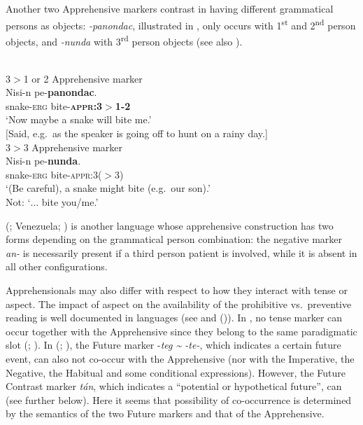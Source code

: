 \documentclass[output=paper,colorlinks,citecolor=brown]{langscibook}
\begin{document}
 Another two  Apprehensive markers contrast in having different grammatical persons as objects: \textit{-panondac}, illustrated in , only occurs with 1\textsuperscript{st} and 2\textsuperscript{nd} person objects, and \textit{-nunda} with 3\textsuperscript{rd} person objects (see also ).

\newpage
\ea \label{ex:intro12} 
\\
\ea \label{ex:intro12a} \textnormal{3$>$1 or 2 Apprehensive marker} \\
\gll Nisi-n pe-\textbf{panondac}. \\
snake-\textsc{erg} bite-\textsc{\textbf{appr:3$>$1-2}} \\
\glt `Now maybe a snake will bite me.' \\
$[$Said, e.g.\  as the speaker is going off to hunt on a rainy day.] \\
\ex \label{ex:intro12b} \textnormal{3$>$3 Apprehensive marker} \\
\gll Nisi-n pe-\textbf{nunda}. \\
snake-\textsc{erg} bite-\textsc{appr:3($>$3)} \\
\glt `(Be careful), a snake might bite (e.g.\  our son).'
\\
Not: `$\ldots$ bite you/me.'
\z
\z

 (; Venezuela; \cite[232--233]{caceres}) is another language whose apprehensive construction has two forms depending on the grammatical person combination: the negative marker \textit{an-} is necessarily present if a third person patient is involved, while it is absent in all other configurations.

Apprehensionals may also differ with respect to how they interact with tense or aspect. The impact of aspect on the availability of the prohibitive vs.\ preventive reading is well documented in  languages (see  and (\citealt{chapters/wiemer})). In , no tense marker can occur together with the Apprehensive since they belong to the same paradigmatic slot (\cite[367, 449]{vuillermet2012}; \cite[268]{vuillermet2018a}). In  (; \cite[607--608]{epps2008}), the Future marker \nobreakdash-\textit{teg \~{ } \nobreakdash-te-}, which indicates a certain future event, can also not co-occur with the Apprehensive (nor with the Imperative, the Negative, the Habitual and some conditional expressions). However, the Future Contrast marker \textit{tán}, which indicates a ``potential or hypothetical future'', can (see  further below). Here it seems that possibility of co-occurrence is determined by the semantics of the two Future markers and that of the Apprehensive. 
\end{document}
